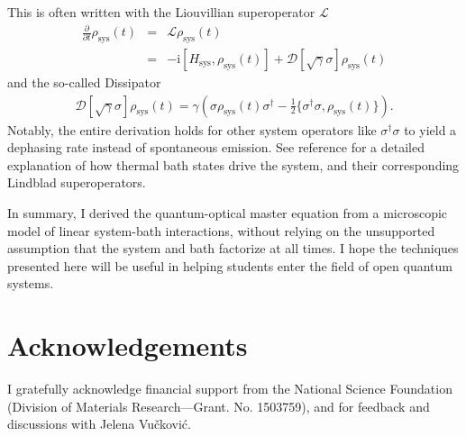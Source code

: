 \documentclass[%
 onecolumn,
 notitlepage,
 longbibliography,
 amsmath,amssymb,
 aps,
 pra,
 10pt,
]{revtex4-1}
\begin{document}
This is often written with the Liouvillian superoperator $\mathcal{L}$
\begin{eqnarray}
\frac{\partial}{\partial t}\rho_\text{sys}(t)&=&\mathcal{L}\rho_\text{sys}(t)\\
&=&-\text{i}\left[H_\text{sys}, \rho_\text{sys}(t)\right] + \mathcal{D}[\sqrt{\gamma}\sigma]\rho_\text{sys}(t)
\end{eqnarray}
and the so-called Dissipator
\begin{eqnarray}
 \mathcal{D}[\sqrt{\gamma}\sigma]\rho_\text{sys}(t)=\gamma\left(\sigma \rho_\text{sys}(t)\sigma^\dagger-\frac{1}{2}\{\sigma^\dagger\sigma,\rho_\text{sys}(t)\}\right).
\end{eqnarray}
Notably, the entire derivation holds for other system operators like $\sigma^\dagger\sigma$ to yield a dephasing rate instead of spontaneous emission. See reference \cite{jacobs2014quantum} for a detailed explanation of how thermal bath states drive the system, and their corresponding Lindblad superoperators.

In summary, I derived the quantum-optical master equation from a microscopic model of linear system-bath interactions, without relying on the unsupported assumption that the system and bath factorize at all times. I hope the techniques presented here will be useful in helping students enter the field of open quantum systems.

\section{Acknowledgements}

I gratefully acknowledge financial support from the National Science Foundation (Division of Materials Research---Grant. No. 1503759), and for feedback and discussions with Jelena Vu\v{c}kovi\'c.





\end{document}
